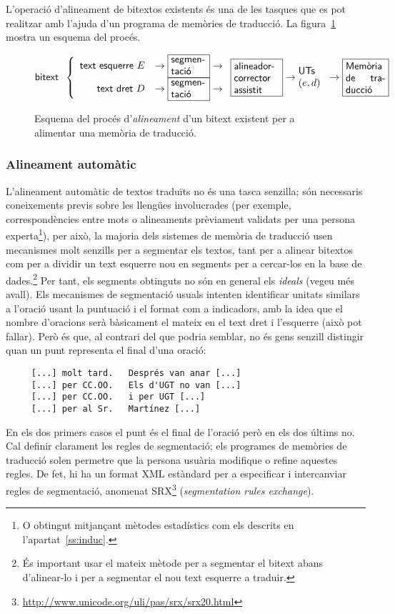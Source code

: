 L'operació d'alineament de bitextos existents és una de les tasques
que es pot realitzar amb l'ajuda d'un programa de memòries de
traducció. La figura~\ref{fg:aliMT} mostra un esquema del procés.
\begin{figure}
{\small
$$
\mbox{\textsf{bitext}}\;\;\left\{\begin{array}{rcl}
\mbox{\textsf{text esquerre $E$}} &\to \mbox{\framebox{\parbox{1.25cm}{\textsf{segmen-
      tació}}}} 
\to \\
\mbox{\textsf{text dret $D$}} &\to \mbox{\framebox{\parbox{1.25cm}{\textsf{segmen- tació}}}} 
\to \\
\end{array}
\right.
\mbox{\framebox{\parbox{1.6cm}{\textsf{alineador- corrector assistit}}}}
\to \mbox{\parbox{1cm}{\textsf{UTs} $(e,d)$}} \to \mbox{\framebox{\parbox{1.4cm}{\textsf{Memòria de traducció}}}}
$$
}
\caption{Esquema del procés d'\emph{alineament} d'un bitext existent per a alimentar
  una memòria de traducció.}
\label{fg:aliMT}
\end{figure}

\subsubsection{Alineament automàtic}

L'alineament automàtic de textos traduïts no és una tasca senzilla;
són necessaris coneixements previs sobre les llengües involucrades
(per exemple, correspondències entre mots o alineaments prèviament
validats per una persona experta\footnote{O obtingut mitjançant
  mètodes estadístics com els descrits en l'apartat~\ref{ss:induc}.}),
per això, la majoria dels sistemes de memòria de traducció usen
mecanismes molt senzills per a segmentar els textos, tant per a
alinear bitextos com per a dividir un text esquerre nou en segments
per a cercar-los en la base de dades.\footnote{És important usar el
  mateix mètode per a segmentar el bitext abans d'alinear-lo i per
   a segmentar el nou text esquerre a traduir.} Per tant, els segments
obtinguts no són en general els \emph{ideals} (vegeu més avall).  Els
mecanismes de segmentació usuals intenten identificar unitats similars
a l'oració usant la puntuació i el format com a indicadors, amb la
idea que el nombre d'oracions serà bàsicament el mateix en el text
dret i l'esquerre (això pot fallar). Però és que, al contrari del que
podria semblar, no és gens senzill distingir quan un punt representa
el final d'una oració:
\begin{verbatim}
     [...] molt tard.   Després van anar [...] 
     [...] per CC.OO.   Els d'UGT no van [...] 
     [...] per CC.OO.   i per UGT [...]          
     [...] per al Sr.   Martínez [...]             
\end{verbatim}
En els dos primers casos el punt és el final de l'oració però en els
dos últims no. Cal definir clarament les regles de segmentació; els
programes de memòries de traducció solen permetre que la persona
usuària modifique o refine aquestes regles. De fet, hi ha un format
XML estàndard per a especificar i intercanviar regles de segmentació,
anomenat
SRX\footnote{\url{http://www.unicode.org/uli/pas/srx/srx20.html}}
(\emph{segmentation rules exchange}).

